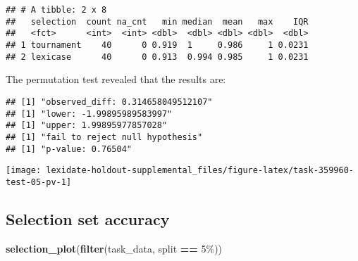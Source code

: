 \documentclass[
]{book}
\newenvironment{Shaded}{\begin{snugshade}}{\end{snugshade}}
\newcommand{\AttributeTok}[1]{\textcolor[rgb]{0.13,0.29,0.53}{#1}}
\newcommand{\DecValTok}[1]{\textcolor[rgb]{0.00,0.00,0.81}{#1}}
\newcommand{\FunctionTok}[1]{\textcolor[rgb]{0.13,0.29,0.53}{\textbf{#1}}}
\newcommand{\NormalTok}[1]{#1}
\newcommand{\OtherTok}[1]{\textcolor[rgb]{0.56,0.35,0.01}{#1}}
\newcommand{\SpecialCharTok}[1]{\textcolor[rgb]{0.81,0.36,0.00}{\textbf{#1}}}
\newcommand{\StringTok}[1]{\textcolor[rgb]{0.31,0.60,0.02}{#1}}
\begin{document}
\begin{verbatim}
## # A tibble: 2 x 8
##   selection  count na_cnt   min median  mean   max    IQR
##   <fct>      <int>  <int> <dbl>  <dbl> <dbl> <dbl>  <dbl>
## 1 tournament    40      0 0.919  1     0.986     1 0.0231
## 2 lexicase      40      0 0.913  0.994 0.985     1 0.0231
\end{verbatim}

The permutation test revealed that the results are:

\begin{Shaded}
\end{Shaded}

\begin{verbatim}
## [1] "observed_diff: 0.314658049512107"
## [1] "lower: -1.99895989583997"
## [1] "upper: 1.99895977857028"
## [1] "fail to reject null hypothesis"
## [1] "p-value: 0.76504"
\end{verbatim}

\texttt{[image: lexidate-holdout-supplemental\_files/figure-latex/task-359960-test-05-pv-1]}

\hypertarget{selection-set-accuracy-45}{%
\subsection{Selection set accuracy}\label{selection-set-accuracy-45}}

\begin{Shaded}
\begin{Highlighting}[]
\FunctionTok{selection\_plot}\NormalTok{(}\FunctionTok{filter}\NormalTok{(task\_data, split }\SpecialCharTok{==} \StringTok{\textquotesingle{}5\%\textquotesingle{}}\NormalTok{))}
\end{Highlighting}
\end{Shaded}
\end{document}
